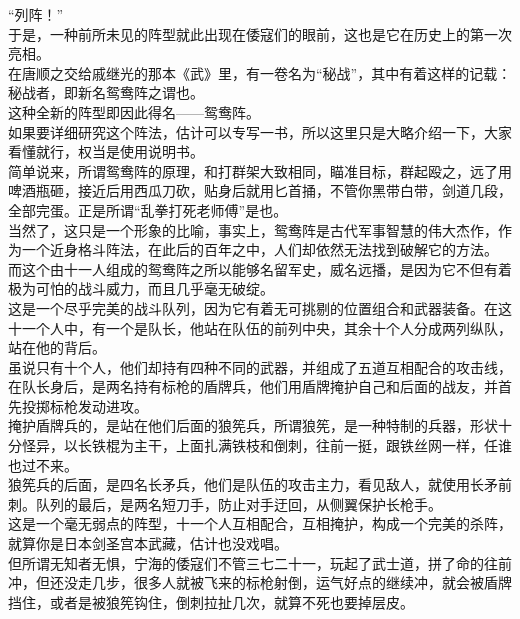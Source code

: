 \begin{multicols}{\theparacolNo}
“列阵！”\\

于是，一种前所未见的阵型就此出现在倭寇们的眼前，这也是它在历史上的第一次亮相。\\

在唐顺之交给戚继光的那本《武》里，有一卷名为“秘战”，其中有着这样的记载：秘战者，即新名鸳鸯阵之谓也。\\

这种全新的阵型即因此得名——鸳鸯阵。\\

如果要详细研究这个阵法，估计可以专写一书，所以这里只是大略介绍一下，大家看懂就行，权当是使用说明书。\\

简单说来，所谓鸳鸯阵的原理，和打群架大致相同，瞄准目标，群起殴之，远了用啤酒瓶砸，接近后用西瓜刀砍，贴身后就用匕首捅，不管你黑带白带，剑道几段，全部完蛋。正是所谓“乱拳打死老师傅”是也。\\

当然了，这只是一个形象的比喻，事实上，鸳鸯阵是古代军事智慧的伟大杰作，作为一个近身格斗阵法，在此后的百年之中，人们却依然无法找到破解它的方法。\\

而这个由十一人组成的鸳鸯阵之所以能够名留军史，威名远播，是因为它不但有着极为可怕的战斗威力，而且几乎毫无破绽。\\

这是一个尽乎完美的战斗队列，因为它有着无可挑剔的位置组合和武器装备。在这十一个人中，有一个是队长，他站在队伍的前列中央，其余十个人分成两列纵队，站在他的背后。\\

虽说只有十个人，他们却持有四种不同的武器，并组成了五道互相配合的攻击线，在队长身后，是两名持有标枪的盾牌兵，他们用盾牌掩护自己和后面的战友，并首先投掷标枪发动进攻。\\

掩护盾牌兵的，是站在他们后面的狼筅兵，所谓狼筅，是一种特制的兵器，形状十分怪异，以长铁棍为主干，上面扎满铁枝和倒刺，往前一挺，跟铁丝网一样，任谁也过不来。\\

狼筅兵的后面，是四名长矛兵，他们是队伍的攻击主力，看见敌人，就使用长矛前刺。队列的最后，是两名短刀手，防止对手迂回，从侧翼保护长枪手。\\

这是一个毫无弱点的阵型，十一个人互相配合，互相掩护，构成一个完美的杀阵，就算你是日本剑圣宫本武藏，估计也没戏唱。\\

但所谓无知者无惧，宁海的倭寇们不管三七二十一，玩起了武士道，拼了命的往前冲，但还没走几步，很多人就被飞来的标枪射倒，运气好点的继续冲，就会被盾牌挡住，或者是被狼筅钩住，倒刺拉扯几次，就算不死也要掉层皮。\\


\end{multicols}
